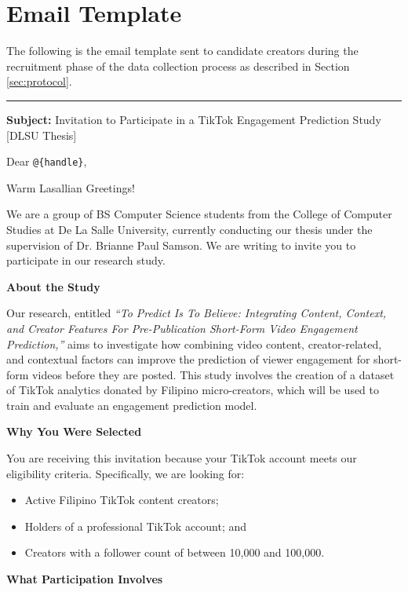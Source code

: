 \chapter{Email Template}
\label{sec:appendixb}

The following is the email template sent to candidate creators during the recruitment phase of the data collection process as described in Section \ref{sec:protocol}.

\noindent\rule{\textwidth}{0.4pt}

\noindent\textbf{Subject:} Invitation to Participate in a TikTok Engagement Prediction Study [DLSU Thesis]

\noindent Dear \texttt{@\{handle\}},

Warm Lasallian Greetings!

We are a group of BS Computer Science students from the College of Computer Studies at De La Salle University, currently conducting our thesis under the supervision of Dr. Brianne Paul Samson. We are writing to invite you to participate in our research study.

\noindent\textbf{About the Study}

Our research, entitled \textit{``To Predict Is To Believe: Integrating Content, Context, and Creator Features For Pre-Publication Short-Form Video Engagement Prediction,''} aims to investigate how combining video content, creator-related, and contextual factors can improve the prediction of viewer engagement for short-form videos before they are posted. This study involves the creation of a dataset of TikTok analytics donated by Filipino micro-creators, which will be used to train and evaluate an engagement prediction model.

\noindent\textbf{Why You Were Selected}

You are receiving this invitation because your TikTok account meets our eligibility criteria. Specifically, we are looking for:
\begin{itemize}
    \item Active Filipino TikTok content creators;
     \item Holders of a professional TikTok account; and
    \item Creators with a follower count of between 10,000 and 100,000.
\end{itemize}

\noindent\textbf{What Participation Involves}

